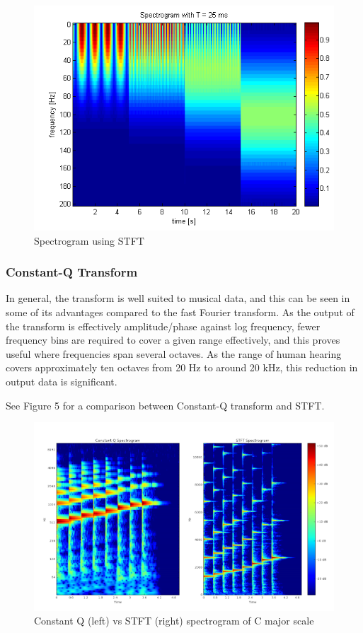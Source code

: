 \begin{figure}[h]
	\caption[Spectrogram using Short-Term Fourier Transform]{ Spectrogram using STFT \cite{stft_fig}}
	\centering
	\includegraphics[width=1\textwidth, height=\textheight, keepaspectratio]{"resources/STFT_spectrogram"}
\end{figure}


\subsubsection{Constant-Q Transform}
In general, the transform is well suited to musical data, and this can be seen in some of its advantages compared to the fast Fourier transform. As the output of the transform is effectively amplitude/phase against log frequency, fewer frequency bins are required to cover a given range effectively, and this proves useful where frequencies span several octaves. As the range of human hearing covers approximately ten octaves from 20 Hz to around 20 kHz, this reduction in output data is significant. \cite{constant_q} \par
 See Figure 5 for a comparison between Constant-Q transform and STFT.


\begin{figure}[h]
	\caption[Constant Q vs STFT spectrogram of C major scale]{ Constant Q (left) vs STFT (right) spectrogram of C major scale}
	\centering
	\label{fig:cq_vs_stft}
	\includegraphics[width=1\textwidth, height=\textheight, keepaspectratio]{"resources/Q_vs_STFT"}
\end{figure}